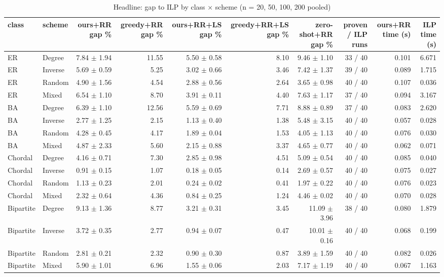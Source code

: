 \begin{table}[t]
\centering
\small
\caption{Headline: gap to ILP by class × scheme (n = 20, 50, 100, 200 pooled)}
\begin{tabular}{llrrrrrrrr}
\toprule
class & scheme & ours+RR gap \% & greedy+RR gap \% & ours+RR+LS gap \% & greedy+RR+LS gap \% & zero-shot+RR gap \% & proven / ILP runs & ours+RR time (s) & ILP time (s) \\
\midrule
ER & Degree & 7.84 $\pm$ 1.94 & 11.55 & 5.50 $\pm$ 0.58 & 8.10 & 9.46 $\pm$ 1.10 & 33 / 40 & 0.101 & 6.671 \\
ER & Inverse & 5.69 $\pm$ 0.59 & 5.25 & 3.02 $\pm$ 0.66 & 3.46 & 7.42 $\pm$ 1.37 & 39 / 40 & 0.089 & 1.715 \\
ER & Random & 4.90 $\pm$ 1.56 & 4.54 & 2.88 $\pm$ 0.56 & 2.64 & 3.65 $\pm$ 0.98 & 40 / 40 & 0.107 & 0.036 \\
ER & Mixed & 6.54 $\pm$ 1.10 & 8.70 & 3.91 $\pm$ 0.11 & 4.40 & 7.63 $\pm$ 1.17 & 37 / 40 & 0.094 & 3.167 \\
BA & Degree & 6.39 $\pm$ 1.10 & 12.56 & 5.59 $\pm$ 0.69 & 7.71 & 8.88 $\pm$ 0.89 & 37 / 40 & 0.083 & 2.620 \\
BA & Inverse & 2.77 $\pm$ 1.25 & 2.15 & 1.13 $\pm$ 0.40 & 1.38 & 5.48 $\pm$ 3.15 & 40 / 40 & 0.057 & 0.028 \\
BA & Random & 4.28 $\pm$ 0.45 & 4.17 & 1.89 $\pm$ 0.04 & 1.53 & 4.05 $\pm$ 1.13 & 40 / 40 & 0.076 & 0.030 \\
BA & Mixed & 4.87 $\pm$ 2.33 & 5.60 & 2.15 $\pm$ 0.88 & 3.37 & 4.65 $\pm$ 0.77 & 40 / 40 & 0.062 & 0.071 \\
Chordal & Degree & 4.16 $\pm$ 0.71 & 7.30 & 2.85 $\pm$ 0.98 & 4.51 & 5.09 $\pm$ 0.54 & 40 / 40 & 0.085 & 0.040 \\
Chordal & Inverse & 0.91 $\pm$ 0.15 & 1.07 & 0.18 $\pm$ 0.05 & 0.14 & 2.69 $\pm$ 0.57 & 40 / 40 & 0.075 & 0.027 \\
Chordal & Random & 1.13 $\pm$ 0.23 & 2.01 & 0.24 $\pm$ 0.02 & 0.41 & 1.97 $\pm$ 0.22 & 40 / 40 & 0.076 & 0.023 \\
Chordal & Mixed & 2.32 $\pm$ 0.64 & 4.36 & 0.84 $\pm$ 0.25 & 1.24 & 4.46 $\pm$ 0.02 & 40 / 40 & 0.070 & 0.028 \\
Bipartite & Degree & 9.13 $\pm$ 1.36 & 8.77 & 3.21 $\pm$ 0.31 & 3.45 & 11.09 $\pm$ 3.96 & 38 / 40 & 0.080 & 1.879 \\
Bipartite & Inverse & 3.72 $\pm$ 0.35 & 2.77 & 0.94 $\pm$ 0.07 & 0.47 & 10.01 $\pm$ 0.16 & 40 / 40 & 0.068 & 0.199 \\
Bipartite & Random & 2.81 $\pm$ 0.21 & 2.32 & 0.90 $\pm$ 0.30 & 0.87 & 3.89 $\pm$ 1.59 & 40 / 40 & 0.082 & 0.026 \\
Bipartite & Mixed & 5.90 $\pm$ 1.01 & 6.96 & 1.55 $\pm$ 0.06 & 2.03 & 7.17 $\pm$ 1.19 & 40 / 40 & 0.067 & 1.163 \\
\bottomrule
\end{tabular}
\end{table}
